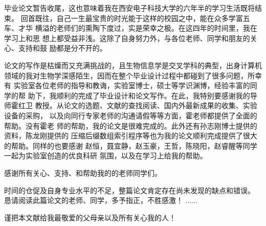 
\begin{thanks}

毕业论文暂告收尾，这也意味着我在西安电子科技大学的六年半的学习生活既将结束。
回首既往，自己一生最宝贵的时光能于这样的校园之中，能在众多学富五车、才华
横溢的老师们的熏陶下度过，实是荣幸之极。在这四年的时间里，我在学习上和思
想上都受益非浅。这除了自身努力外，与各位老师、同学和朋友的关心、支持和鼓
励都是分不开的。

论文的写作是枯燥而又充满挑战的，且生物信息学是交叉学科的典型，出身计算机
领域的我对生物学深感陌生，因而在整个毕业设计过程中都碰到了很多问题，所幸有
实验室各位老师的指导和教诲，实验室博士，硕士等学识渊博，经验丰富的同学的帮
助下，我顺利的完成了毕业设计和论文写作。在此，我特别要感谢我的导师霍红卫
教授。从论文的选题、文献的查找阅读、国内外最新成果的收集、实验设备的采购，
以及向同行专家老师的沟通请假等等方面，霍老师都提供了全面的帮助。没有霍老
师的帮助，我的论文是很难完成的。此外还有孙志刚博士提供的资料，陈龙刚提供的
压缩后缀数组索引程序等也为我的论文顺利完成提供了很大的帮助。同样的也要感谢
赵恒，聂宜静，赵玉豪，王哲，陈晓阳，赵睿醒等同学一起为实验室创造的优良科研
氛围，以及在学习上给我的帮助。

感谢所有关心、支持、和帮助我的的老师同学们。

时间的仓促及自身专业水平的不足，整篇论文肯定存在尚未发现的缺点和错误。
恳请阅读此篇论文的老师、同学，多予指正，不胜感激！
......

\vskip 18pt

谨把本文献给我最敬爱的父母亲以及所有关心我的人！

\end{thanks}
